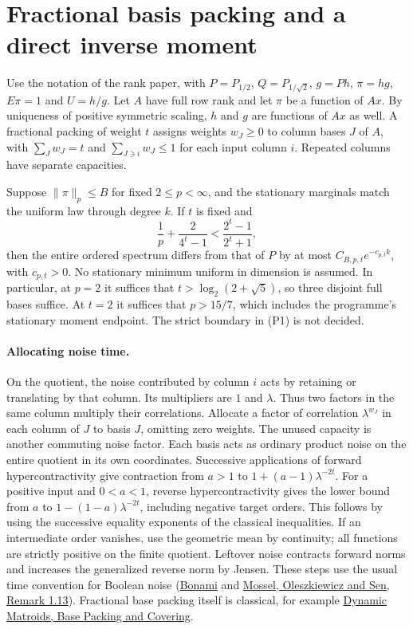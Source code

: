 \section{Fractional basis packing and a direct inverse moment}

Use the notation of the rank paper, with $P=P_{1/2}$, $Q=P_{1/\sqrt2}$,
$g=Ph$, $\pi=hg$, $E\pi=1$ and $U=h/g$. Let $A$ have full row rank
and let $\pi$ be a function of $Ax$. By uniqueness of positive symmetric
scaling, $h$ and $g$ are functions of $Ax$ as well. A fractional packing of
weight $t$ assigns weights $w_J\ge0$ to column bases $J$ of $A$, with
$\sum_Jw_J=t$ and $\sum_{J\ni i}w_J\le1$ for each input column $i$.
Repeated columns have separate capacities.

Suppose $\|\pi\|_p\le B$ for fixed $2\le p<\infty$, and the stationary
marginals match the uniform law through degree $k$. If $t$ is fixed and
\[
       \frac1p+\frac{2}{4^t-1}<\frac{2^t-1}{2^t+1},                 \tag{P1}
\]
then the entire ordered spectrum differs from that of $P$ by at most
$C_{B,p,t}e^{-c_{p,t}k}$, with $c_{p,t}>0$. No stationary minimum
uniform in dimension is assumed. In particular, at $p=2$ it suffices that
$t>\log_2(2+\sqrt5)$, so three disjoint full bases suffice. At $t=2$
it suffices that $p>15/7$, which includes the programme's stationary
moment endpoint. The strict boundary in (P1) is not decided.

\paragraph{Allocating noise time.}
On the quotient, the noise contributed by column $i$ acts by retaining
or translating by that column. Its multipliers are $1$ and $\lambda$.
Thus two factors in the same column multiply their correlations.
Allocate a factor of correlation $\lambda^{w_J}$ in each column of $J$
to basis $J$, omitting zero weights. The unused capacity is another
commuting noise factor. Each basis acts as ordinary product noise on the
entire quotient in its own coordinates. Successive applications of
forward hypercontractivity give contraction from $a>1$ to
$1+(a-1)\lambda^{-2t}$. For a positive input and $0<a<1$, reverse
hypercontractivity gives the lower bound from $a$ to
$1-(1-a)\lambda^{-2t}$, including negative target orders. This follows
by using the successive equality exponents of the classical inequalities.
If an intermediate order vanishes, use the geometric mean by continuity;
all functions are strictly positive on the finite quotient. Leftover
noise contracts forward norms and increases the generalized reverse norm
by Jensen. These steps use the usual time convention for Boolean noise
(\href{https://doi.org/10.5802/aif.357}{Bonami} and
\href{https://arxiv.org/abs/1108.1210}{Mossel, Oleszkiewicz and Sen,
Remark 1.13}). Fractional base packing itself is classical, for example
\href{https://doi.org/10.4230/LIPIcs.ESA.2026.57}{Dynamic Matroids,
Base Packing and Covering}.

